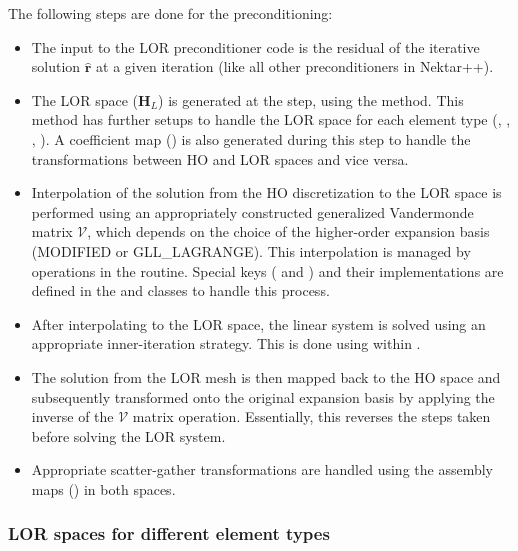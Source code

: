 The following steps are done for the preconditioning:
\begin{itemize}
  \item The input to the LOR preconditioner code is the residual of the iterative solution $\hat{\mathbf{r}}$ at a given iteration (like all other preconditioners in Nektar++).
  \item The LOR space ($\mathbf{H}_L$) is generated at the  step, using the  method. This method has further setups to handle the LOR space for each element type (, , , ). A coefficient map () is also generated during this step to handle the transformations between HO and LOR spaces and vice versa.
  \item Interpolation of the solution from the HO discretization to the LOR space is performed using an appropriately constructed generalized Vandermonde matrix $\mathcal{V}$, which depends on the choice of the higher-order expansion basis (MODIFIED or GLL\_LAGRANGE). This interpolation is managed by  operations in the  routine. Special keys ( and ) and their implementations are defined in the  and  classes to handle this process.
  \item After interpolating to the LOR space, the linear system is solved using an appropriate inner-iteration strategy. This is done using  within .
  \item The solution from the LOR mesh is then mapped back to the HO space and subsequently transformed onto the original expansion basis by applying the inverse of the $\mathcal{V}$ matrix operation. Essentially, this reverses the steps taken before solving the LOR system.
  \item Appropriate scatter-gather transformations are handled using the assembly maps () in both spaces.
\end{itemize}

\subsubsection{LOR spaces for different element types}

